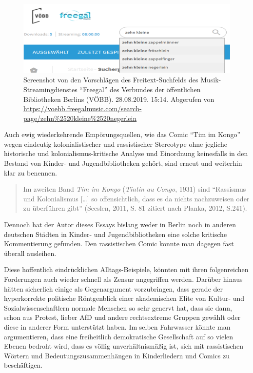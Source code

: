 \documentclass[a4paper,
fontsize=11pt,
oneside,
numbers=noperiodatend,
parskip=half-,
bibliography=totoc,
final
]{scrartcl}
\begin{document}
\begin{figure}
\centering
\includegraphics{abb_1.png}
\caption{Screenshot von den Vorschlägen des Freitext-Suchfelds des
Musik-Streamingdienstes \enquote{Freegal} des Verbundes der öffentlichen
Bibliotheken Berlins (VÖBB). 28.08.2019. 15:14. Abgerufen von
\url{https://voebb.freegalmusic.com/search-page/zehn\%2520kleine\%2520negerlein}}
\end{figure}

Auch ewig wiederkehrende Empörungsquellen, wie das Comic \enquote{Tim im
Kongo} wegen eindeutig kolonialistischer und rassistischer Stereotype
ohne jegliche historische und kolonialismus-kritische Analyse und
Einordnung keinesfalls in den Bestand von Kinder- und Jugendbibliotheken
gehört, sind erneut und weiterhin klar zu benennen.

\begin{quote}
Im zweiten Band \emph{Tim im Kongo} (\emph{Tintin au Congo}, 1931) sind
\enquote{Rassismus und Kolonialismus {[}\ldots{}{]} so offensichtlich,
dass es da nichts nachzuweisen oder zu überführen gibt} (Seeslen, 2011,
S. 81 zitiert nach Planka, 2012, S.241).
\end{quote}

Dennoch hat der Autor dieses Essays bislang weder in Berlin noch in
anderen deutschen Städten in Kinder- und Jugendbibliotheken eine solche
kritische Kommentierung gefunden. Den rassistischen Comic konnte man
dagegen fast überall ausleihen.

Diese hoffentlich eindrücklichen Alltags-Beispiele, könnten mit ihren
folgenreichen Forderungen auch wieder schnell als Zensur angegriffen
werden. Darüber hinaus hätten sicherlich einige als Gegenargument
vorzubringen, dass gerade der hyperkorrekte politische Röntgenblick
einer akademischen Elite von Kultur- und Sozialwissenschaftlern normale
Menschen so sehr genervt hat, dass sie dann, schon aus Protest, lieber
AfD und andere rechtsextreme Gruppen gewählt oder diese in anderer Form
unterstützt haben. Im selben Fahrwasser könnte man argumentieren, dass
eine freiheitlich demokratische Gesellschaft auf so vielen Ebenen
bedroht wird, dass es völlig unverhältnismäßig ist, sich mit
rassistischen Wörtern und Bedeutungszusammenhängen in Kinderliedern und
Comics zu beschäftigen.
\end{document}
